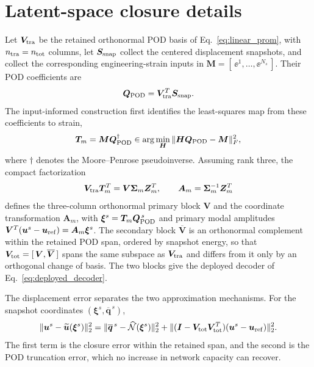 \section{Latent-space closure details}
\label{app:latent_closure}
Let $\bm V_{\rm tra}$ be the retained orthonormal POD basis of Eq.~\eqref{eq:linear_prom}, with $n_{\rm tra}=n_{\rm tot}$ columns, let $\bm S_{\rm snap}$ collect the centered displacement snapshots, and collect the corresponding engineering-strain inputs in $\bm M=[\,\ee^1,\ldots,\ee^{N_s}\,]$. Their POD coefficients are
\begin{equation}
 \bm Q_{\rm POD}=\bm V_{\rm tra}^T\bm S_{\rm snap}.
\end{equation}
The input-informed construction first identifies the least-squares map from these coefficients to strain,
\begin{equation}
 \bm T_m=\bm M\bm Q_{\rm POD}^{\dagger}
 \in\arg\min_{\bm H}\|\bm H\bm Q_{\rm POD}-\bm M\|_F^2,
\end{equation}
where $\dagger$ denotes the Moore--Penrose pseudoinverse. Assuming rank three, the compact factorization
\begin{equation}
 \bm V_{\rm tra}\bm T_m^T=\bm V\bm\Sigma_m\bm Z_m^T,
 \qquad
 \bm A_m=\bm\Sigma_m^{-1}\bm Z_m^T
\end{equation}
defines the three-column orthonormal primary block $\bm V$ and the coordinate transformation $\bm A_m$, with $\bm\xi^s=\bm T_m\bm Q_{\rm POD}^{\,s}$ and primary modal amplitudes $\bm V^T(\bm u^s-\bm u_{\rm ref})=\bm A_m\bm\xi^s$. The secondary block $\overline{\bm V}$ is an orthonormal complement within the retained POD span, ordered by snapshot energy, so that $\bm V_{\rm tot}=[\,\bm V,\overline{\bm V}\,]$ spans the same subspace as $\bm V_{\rm tra}$ and differs from it only by an orthogonal change of basis. The two blocks give the deployed decoder of Eq.~\eqref{eq:deployed_decoder}.

The displacement error separates the two approximation mechanisms. For the snapshot coordinates $(\bm\xi^s,\overline{\bm q}^{\,s})$,
\begin{equation}
 \|\bm u^s-\widetilde{\bm u}(\bm\xi^s)\|_2^2
 =\|\overline{\bm q}^{\,s}-\widehat{\mathcal N}(\bm\xi^s)\|_2^2
 +\|(\bm I-\bm V_{\rm tot}\bm V_{\rm tot}^T)
       (\bm u^s-\bm u_{\rm ref})\|_2^2.
\end{equation}
The first term is the closure error within the retained span, and the second is the POD truncation error, which no increase in network capacity can recover.

